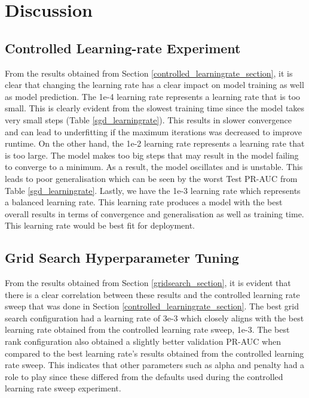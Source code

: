 \section{Discussion}

\subsection{Controlled Learning-rate Experiment}\label{controlled_discussion}

From the results obtained from Section \ref{controlled_learningrate_section}, it is clear that changing the learning rate has a clear impact on model training as well as model
prediction. The 1e-4 learning rate represents a learning rate that is too small. This is clearly evident from the slowest training time since the model takes very small steps (Table \ref{sgd_learningrate}). 
This results in slower convergence and can lead to underfitting if the maximum iterations was decreased to improve runtime. On the other 
hand, the 1e-2 learning rate represents a learning rate that is too large. The model makes too big steps that may result in the model failing to converge to a minimum. 
As a result, the model oscillates and is unstable. This leads to poor generalisation which can be seen by the worst Test PR-AUC from Table \ref{sgd_learningrate}. Lastly, 
we have the 1e-3 learning rate which represents a balanced learning rate. This learning rate produces a model with the best overall results in terms of convergence and 
generalisation as well as training time. This learning rate would be best fit for deployment.

\subsection{Grid Search Hyperparameter Tuning}

From the results obtained from Section \ref{gridsearch_section}, it is evident that there is a clear correlation between these results and the controlled learning rate sweep that
was done in Section \ref{controlled_learningrate_section}. The best grid search configuration had a learning rate of 3e-3 which closely aligns with the best learning rate
obtained from the controlled learning rate sweep, 1e-3. The best rank configuration also obtained a slightly better validation PR-AUC when compared to the best 
learning rate's results obtained from the controlled learning rate sweep. This indicates that other parameters such as alpha and penalty had a role to play since these differed
from the defaults used during the controlled learning rate sweep experiment.

